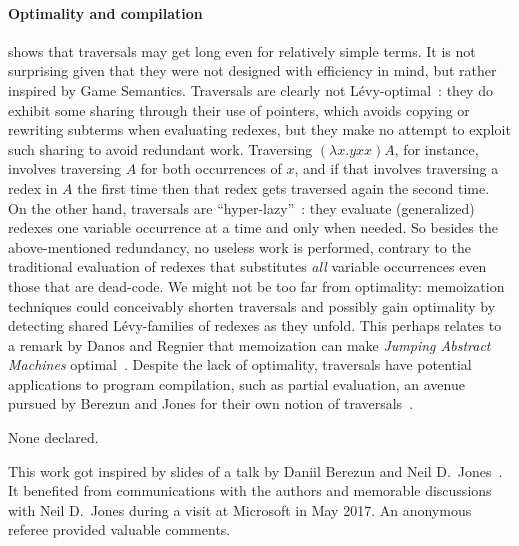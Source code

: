 \documentclass[xchauthor,chkrefs,GCNS,amsmath,amsthm,rotating,leaveRGB]{tcsg}
\theoremstyle{plain}
\theoremstyle{definition}
\begin{document}
\paragraph*{Optimality and compilation}
 shows that traversals may get long
even for relatively simple terms. It is not surprising given that they were
not designed with efficiency in mind, but rather inspired by Game Semantics.
Traversals are clearly not L\'{e}vy-optimal~\cite{optimal-reduction-levy}: they
do exhibit some sharing through their use of pointers, which avoids copying
or rewriting subterms when evaluating redexes, but they make no attempt to
exploit such sharing to avoid redundant work. Traversing $(\lambda x. y x x)
A$, for instance, involves traversing $A$ for both occurrences of $x$, and if
that involves traversing a redex in $A$ the first time then that redex gets
traversed again the second time. On the other hand, traversals are
``hyper-lazy''~\cite{danosherbelinregnier1996}: they evaluate (generalized)
redexes one variable occurrence at a time and only when needed. So besides
the above-mentioned  redundancy, no useless work is performed, contrary to
the traditional evaluation of redexes that substitutes \emph{all} variable
occurrences even those that are dead-code. We might not be too far from
optimality: memoization techniques could conceivably shorten traversals and
possibly gain optimality by detecting shared L\'{e}vy-families of redexes as
they unfold. This perhaps relates to a remark by Danos and Regnier that
memoization can make \emph{Jumping Abstract Machines}
optimal~\cite{DANOS199979}. Despite the lack of optimality, traversals have
potential applications to program compilation, such as partial evaluation, an
avenue pursued by Berezun and Jones for their own notion of
traversals~\cite{berezunjones_partialevalbytraversals}.






\begin{conflict}
None declared.
\end{conflict}





\begin{acks}
This work got inspired by slides of a talk by Daniil Berezun and Neil
D.~Jones~\cite{berezunjones_partialevalbytraversals}. It benefited from
communications with the authors and memorable discussions with Neil D.~Jones
during a visit at Microsoft in May 2017. An anonymous referee provided
valuable comments.
\end{acks}
\end{document}
